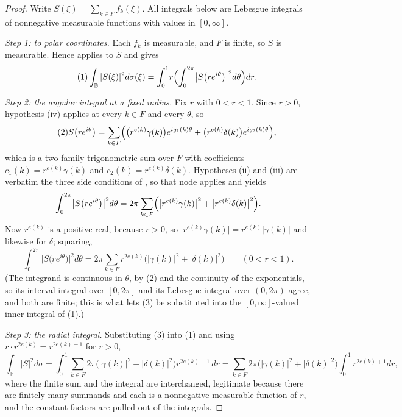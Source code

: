 \begin{proof}
Write $S(\xi)=\sum_{k\in F}f_k(\xi)$.  All integrals below are Lebesgue
integrals of nonnegative measurable functions with values in $[0,\infty]$.

\emph{Step 1: to polar coordinates.}  Each $f_k$ is measurable, and $F$ is
finite, so $S$ is measurable.  Hence  applies to
$S$ and gives
\begin{equation}\tag{1}
  \int_{\mathbb{B}}|S(\xi)|^{2}d\sigma(\xi)
  =\int_{0}^{1}\!r\Bigl(\int_{0}^{2\pi}
      \bigl|S\bigl(re^{i\theta}\bigr)\bigr|^{2}d\theta\Bigr)dr .
\end{equation}

\emph{Step 2: the angular integral at a fixed radius.}  Fix $r$ with
$0<r<1$.  Since $r>0$, hypothesis (iv) applies at every $k\in F$ and every
$\theta$, so
\begin{equation}\tag{2}
  S\bigl(re^{i\theta}\bigr)
  =\sum_{k\in F}\Bigl(\bigl(r^{e(k)}\gamma(k)\bigr)e^{ig_1(k)\theta}
     +\bigl(r^{e(k)}\delta(k)\bigr)e^{ig_2(k)\theta}\Bigr),
\end{equation}
which is a two-family trigonometric sum over $F$ with coefficients
$c_1(k)=r^{e(k)}\gamma(k)$ and $c_2(k)=r^{e(k)}\delta(k)$.  Hypotheses (ii)
and (iii) are verbatim the three side conditions of
, so that node applies and yields
\[
  \int_{0}^{2\pi}\bigl|S\bigl(re^{i\theta}\bigr)\bigr|^{2}d\theta
  =2\pi\sum_{k\in F}\Bigl(\bigl|r^{e(k)}\gamma(k)\bigr|^{2}
    +\bigl|r^{e(k)}\delta(k)\bigr|^{2}\Bigr).
\]
Now $r^{e(k)}$ is a positive real, because $r>0$, so
$\bigl|r^{e(k)}\gamma(k)\bigr|=r^{e(k)}|\gamma(k)|$ and likewise for $\delta$;
squaring,
\begin{equation}\tag{3}
  \int_{0}^{2\pi}\bigl|S\bigl(re^{i\theta}\bigr)\bigr|^{2}d\theta
  =2\pi\sum_{k\in F}r^{2e(k)}
    \bigl(|\gamma(k)|^{2}+|\delta(k)|^{2}\bigr)
  \qquad(0<r<1).
\end{equation}
(The integrand is continuous in $\theta$, by (2) and the continuity of the
exponentials, so its interval integral over $[0,2\pi]$ and its Lebesgue
integral over $(0,2\pi)$ agree, and both are finite; this is what lets (3) be
substituted into the $[0,\infty]$-valued inner integral of (1).)

\emph{Step 3: the radial integral.}  Substituting (3) into (1) and using
$r\cdot r^{2e(k)}=r^{2e(k)+1}$ for $r>0$,
\[
  \int_{\mathbb{B}}|S|^{2}d\sigma
  =\int_{0}^{1}\sum_{k\in F}2\pi
      \bigl(|\gamma(k)|^{2}+|\delta(k)|^{2}\bigr)r^{2e(k)+1}\,dr
  =\sum_{k\in F}2\pi\bigl(|\gamma(k)|^{2}+|\delta(k)|^{2}\bigr)
     \int_{0}^{1}r^{2e(k)+1}dr ,
\]
where the finite sum and the integral are interchanged, legitimate because
there are finitely many summands and each is a nonnegative measurable function
of $r$, and the constant factors are pulled out of the integrals.


\end{proof}
